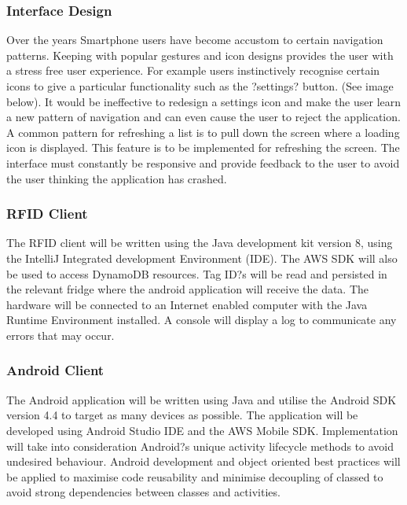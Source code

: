 \documentclass[a4paper, 11pt]{article}
\begin{document}
\subsubsection {Interface Design}
Over the years Smartphone users have become accustom to certain navigation patterns. Keeping with popular gestures and icon designs provides the user with a stress free user experience. For example users instinctively recognise certain icons to give a particular functionality such as the ?settings? button. (See image below). It would be ineffective to redesign a settings icon and make the user learn a new pattern of navigation and can even cause the user to reject the application. A common pattern for refreshing a list is to pull down the screen where a loading icon is displayed. This feature is to be implemented for refreshing the screen. The interface must constantly be responsive and provide feedback to the user to avoid the user thinking the application has crashed. 

\subsubsection {RFID Client}
The RFID client will be written using the Java development kit version 8, using the IntelliJ Integrated development Environment (IDE). The AWS SDK will also be used to access DynamoDB resources. Tag ID?s will be read and persisted in the relevant fridge where the android application will receive the data. The hardware will be connected to an Internet enabled computer with the Java Runtime Environment installed. A console will display a log to communicate any errors that may occur. 

\subsubsection {Android Client}
The Android application will be written using Java and utilise the Android SDK version 4.4 to target as many devices as possible. The application will be developed using Android Studio IDE and the AWS Mobile SDK. Implementation will take into consideration Android?s unique activity lifecycle methods to avoid undesired behaviour. Android development and object oriented best practices will be applied to maximise code reusability and minimise decoupling of classed to avoid strong dependencies between classes and activities.

\clearpage

\end{document}
